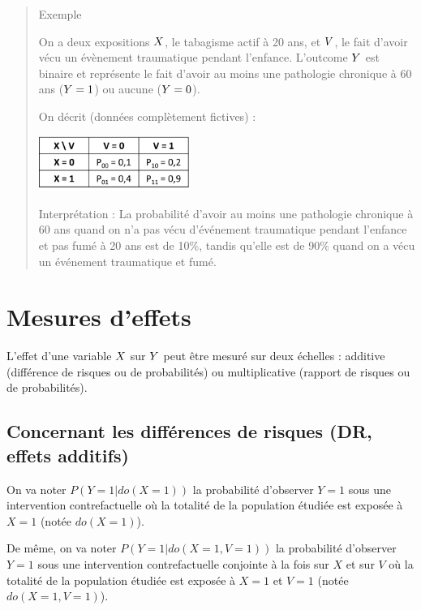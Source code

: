\documentclass[
]{book}
\begin{document}
\begin{quote}
Exemple

On a deux expositions \(\small X\), le tabagisme actif à 20 ans, et \(\small V\), le fait d'avoir vécu un évènement traumatique pendant l'enfance. L'outcome \(\small Y\) est binaire et représente le fait d'avoir au moins une pathologie chronique à 60 ans (\(\small Y=1\)) ou aucune (\(\small Y=0\)).

On décrit (données complètement fictives) :

\includegraphics[width=0.4\textwidth,height=\textheight]{img/Image1.png}

Interprétation : La probabilité d'avoir au moins une pathologie chronique à 60 ans quand on n'a pas vécu d'événement traumatique pendant l'enfance et pas fumé à 20 ans est de 10\%, tandis qu'elle est de 90\% quand on a vécu un événement traumatique et fumé.
\end{quote}

\hypertarget{mesures-deffets}{%
\section{Mesures d'effets}\label{mesures-deffets}}

L'effet d'une variable \(\small X\) sur \(\small Y\) peut être mesuré sur deux échelles : additive (différence de risques ou de probabilités) ou multiplicative (rapport de risques ou de probabilités).

\hypertarget{concernant-les-diffuxe9rences-de-risques-dr-effets-additifs}{%
\subsection*{Concernant les différences de risques (DR, effets additifs)}\label{concernant-les-diffuxe9rences-de-risques-dr-effets-additifs}}

On va noter \(P(Y = 1|do(X = 1))\) la probabilité d'observer \(Y=1\) sous une intervention contrefactuelle où la totalité de la population étudiée est exposée à \(X=1\) (notée \(do(X=1)\)).

De même, on va noter \(P(Y = 1|do(X=1,V=1))\) la probabilité d'observer \(Y=1\) sous une intervention contrefactuelle conjointe à la fois sur \(X\) et sur \(V\) où la totalité de la population étudiée est exposée à \(X=1\) et \(V=1\) (notée \(do(X=1,V=1)\)).
\end{document}
